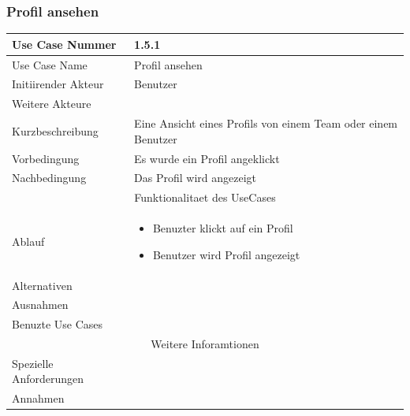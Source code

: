 \documentclass[10pt,a4paper]{article}
\begin{document}
	\subsubsection{Profil ansehen}
		\begin{tabular}{|l|p{.5\linewidth}|}
		\hline Use Case Nummer & 1.5.1 \\ 
		\hline Use Case Name & Profil ansehen \\ 
		\hline Initiirender Akteur & Benutzer \\
		\hline Weitere Akteure &  \\
		\hline Kurzbeschreibung & Eine Ansicht eines Profils von einem Team oder einem Benutzer \\
		\hline Vorbedingung & Es wurde ein Profil angeklickt \\
		\hline Nachbedingung & Das Profil wird angezeigt \\
		\hline \multicolumn{2}{|c|}{Funktionalitaet des UseCases}\\
		\hline Ablauf & \begin{itemize}
			\item Benuzter klickt auf ein Profil
			\item Benutzer wird Profil angezeigt
		\end{itemize} \\
		\hline Alternativen &  \\
		\hline Ausnahmen &  \\
		\hline Benuzte Use Cases &  \\
		\hline \multicolumn{2}{|c|}{Weitere Inforamtionen} \\
		\hline Spezielle Anforderungen &  \\
		\hline Annahmen &  \\
		\hline
		\end{tabular}
\end{document}

